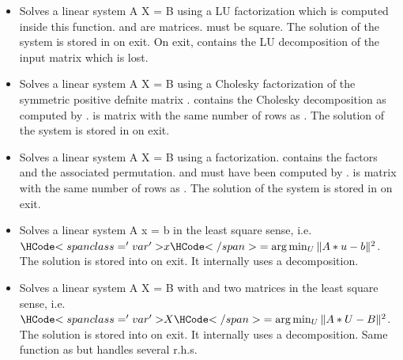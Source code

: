 \begin{itemize}
\item {} 
  \sshortdescribe Solves a linear system A X = B using a LU factorization
  which is computed inside this function.  and   are
  matrices.  must be square. The solution of the system is stored in
   on exit. On exit,  contains the LU decomposition of the input
  matrix which is lost.

\item {}
  \sshortdescribe Solves a linear system A X = B using a Cholesky factorization
  of the symmetric positive defnite matrix .   contains the
  Cholesky decomposition as computed by .  is matrix
  with the same number of rows as . The solution of
  the system is stored in  on exit. 

\item {}
  \sshortdescribe Solves a linear system A X = B using a  factorization.
   contains the  factors and  the associated permutation.
   and  must have been computed by .  is matrix
  with the same number of rows as .
  The solution of the system is stored in  on exit. 

\item {}
  \sshortdescribe Solves a linear system A x = b in the least square sense,
  i.e. $\var{x} = \arg\min_U \| A * u - b\|^2$. The solution is stored into
   on exit. It internally uses a  decomposition.

\item {}
  \sshortdescribe Solves a linear system A X = B with  and  two
  matrices in the least square sense, i.e. $\var{X} = \arg\min_U \| A * U -
  B\|^2$. The solution is stored into  on exit. It internally uses a
   decomposition. Same function as  but handles
  several r.h.s.

\end{itemize}


